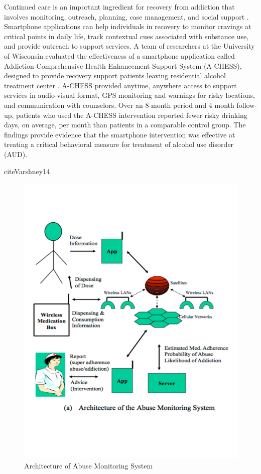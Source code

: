 \documentclass[sigconf]{acmart}
\begin{document}
Continued care is an important ingredient for recovery from addiction that
involves monitoring, outreach, planning, case management, and social support 
\cite{johnson11}. Smartphone applications can help individuals in recovery to 
monitor cravings at critical points in daily life, track contextual cues 
associated with substance use, and provide outreach to support services. A team 
of researchers at the University of Wisconsin evaluated the effectiveness of a
smartphone application called Addiction Comprehensive Health Enhancement Support 
System (A-CHESS), designed to provide recovery support patients leaving 
residential alcohol treatment center \cite{gustafson14}. A-CHESS provided anytime, 
anywhere access to support services in audio-visual format, GPS monitoring and 
warnings for risky locations, and communication with counselors. Over an 8-month
period and 4 month follow-up, patients who used the A-CHESS intervention reported
fewer risky drinking days, on average, per month than patients in a comparable
control group. The findings provide evidence that the smartphone intervention was 
effective at treating a critical behavioral measure for treatment of alcohol use 
disorder (AUD). 

cite{Varshney14}


\begin{figure}[!ht]
  \centering\includegraphics[width=\columnwidth]{images/Figure3.pdf}
  \caption{Architecture of Abuse Monitoring System \cite{Varshney14}
  }\label{f:Figure3}
\end{figure}
\end{document}
